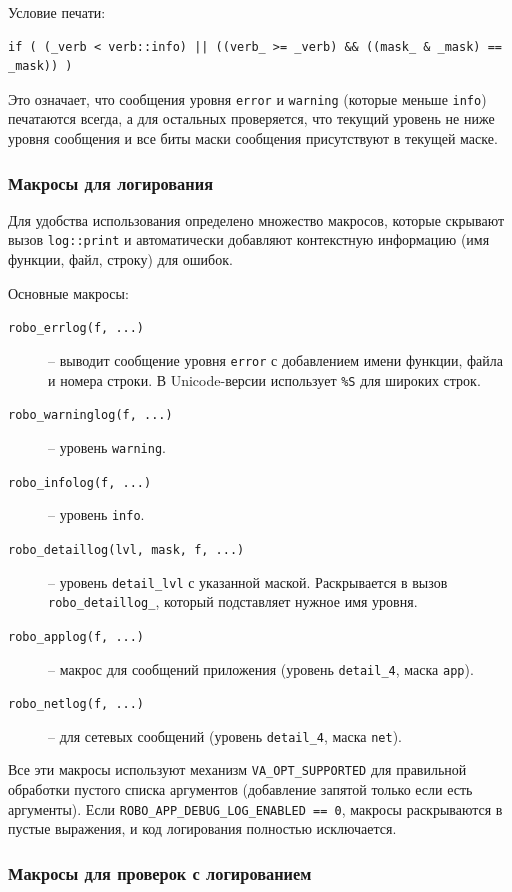 \documentclass[a4paper,12pt]{article}
\begin{document}
Условие печати:
\begin{lstlisting}
if ( (_verb < verb::info) || ((verb_ >= _verb) && ((mask_ & _mask) == _mask)) )
\end{lstlisting}
Это означает, что сообщения уровня \texttt{error} и \texttt{warning} (которые меньше \texttt{info}) печатаются всегда, а для остальных проверяется, что текущий уровень не ниже уровня сообщения и все биты маски сообщения присутствуют в текущей маске.

\subsubsection{Макросы для логирования}

Для удобства использования определено множество макросов, которые скрывают вызов \texttt{log::print} и автоматически добавляют контекстную информацию (имя функции, файл, строку) для ошибок.

Основные макросы:

\begin{description}
    \item[\texttt{robo\_errlog(f, ...)}] -- выводит сообщение уровня \texttt{error} с добавлением имени функции, файла и номера строки. В Unicode-версии использует \texttt{\%S} для широких строк.
    \item[\texttt{robo\_warninglog(f, ...)}] -- уровень \texttt{warning}.
    \item[\texttt{robo\_infolog(f, ...)}] -- уровень \texttt{info}.
    \item[\texttt{robo\_detaillog(lvl, mask, f, ...)}] -- уровень \texttt{detail\_lvl} с указанной маской. Раскрывается в вызов \texttt{robo\_detaillog\_}, который подставляет нужное имя уровня.
    \item[\texttt{robo\_applog(f, ...)}] -- макрос для сообщений приложения (уровень \texttt{detail\_4}, маска \texttt{app}).
    \item[\texttt{robo\_netlog(f, ...)}] -- для сетевых сообщений (уровень \texttt{detail\_4}, маска \texttt{net}).
\end{description}

Все эти макросы используют механизм \texttt{VA\_OPT\_SUPPORTED} для правильной обработки пустого списка аргументов (добавление запятой только если есть аргументы). Если \texttt{ROBO\_APP\_DEBUG\_LOG\_ENABLED == 0}, макросы раскрываются в пустые выражения, и код логирования полностью исключается.

\subsubsection{Макросы для проверок с логированием}
\end{document}
